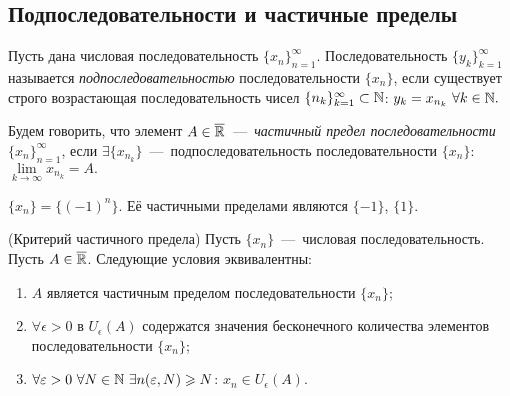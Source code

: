 \subsection{Подпоследовательности и частичные пределы}
\begin{definition}
    Пусть дана числовая последовательность $\{ x_{n} \}^{\infty}_{n = 1}.$ Последовательность $\{ y_{k} \}^{\infty}_{k = 1}$ называется \textit{подпоследовательностью} последовательности $\{ x_{n} \}$, если существует строго возрастающая последовательность чисел $\{ n_{k} \}^{\infty}_{k = 1} \subset \mathbb{N}$: $y_{k} = x_{n_{k}} \ \forall k \in \mathbb{N}.$
\end{definition}
\begin{definition}
    Будем говорить, что элемент $A \in \overline{\mathbb{R}}$~---~\textit{частичный предел последовательности} $\{ x_{n} \}^{\infty}_{n = 1}$, если $\exists \{ x_{n_{k}} \}$~---~подпоследовательность последовательности $\{ x_{n} \}$: $\lim\limits_{k\to \infty} x_{n_{k}} = A .$
\end{definition}
\begin{example}
    $\{ x_{n} \} = \{ (-1)^{n} \}.$ Её частичными пределами являются $\{ -1 \}$, $\{ 1 \}$.
\end{example}
\begin{theorem}
    (Критерий частичного предела) Пусть $\{ x_{n} \}$~---~числовая последовательность. Пусть $A \in \overline{\mathbb{R}}$. Следующие условия эквивалентны:
    \begin{enumerate}
        \item $A$ является частичным пределом последовательности $\{ x_{n} \}$;
        \item $\forall \epsilon > 0$ в $U_{\epsilon} (A)$ содержатся значения бесконечного количества элементов последовательности $\{ x_{n} \}$;
        \item  $\forall \varepsilon > 0 \  \forall N \in \mathbb{N} \  \exists n (\varepsilon, N) \geqslant N$: $x_{n} \in U_{\epsilon} (A).$
    \end{enumerate}
\end{theorem}

